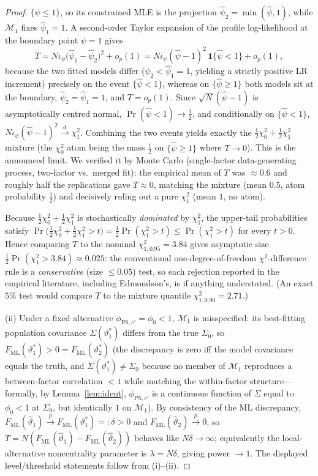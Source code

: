 \documentclass{amsart}
\theoremstyle{remark}
\begin{document}
\begin{proof}
$\{\psi\le1\}$, so its constrained MLE is the projection
$\hat\psi_{2}=\min(\hat\psi,1)$, while $\mathcal M_1$ fixes $\hat\psi_{1}=1$. A
second-order Taylor expansion of the profile log-likelihood at the boundary point
$\psi=1$ gives
\[
T= N\iota_\psi\big(\hat\psi_{1}-\hat\psi_{2}\big)^2+o_p(1)
 = N\iota_\psi(\hat\psi-1)^2\,\mathbf 1\{\hat\psi<1\}+o_p(1),
\]
because the two fitted models differ ($\hat\psi_2<\hat\psi_1=1$, yielding a strictly
positive LR increment) precisely on the event $\{\hat\psi<1\}$, whereas on
$\{\hat\psi\ge1\}$ both models sit at the boundary, $\hat\psi_2=\hat\psi_1=1$, and
$T=o_p(1)$. Since $\sqrt N(\hat\psi-1)$ is asymptotically centred normal,
$\Pr(\hat\psi<1)\to\tfrac12$, and conditionally on $\{\hat\psi<1\}$,
$N\iota_\psi(\hat\psi-1)^2\xrightarrow{d}\chi^2_1$. Combining the two events yields
exactly the $\tfrac12\chi^2_0+\tfrac12\chi^2_1$ mixture (the $\chi^2_0$ atom being
the mass $\tfrac12$ on $\{\hat\psi\ge1\}$ where $T\to0$). This is the announced
limit. We verified it by
Monte Carlo (single-factor data-generating process, two-factor vs.\ merged fit):
the empirical mean of $T$ was $\approx0.6$ and roughly half the replications gave
$T\approx0$, matching the mixture (mean $0.5$, atom probability $\tfrac12$) and
decisively ruling out a pure $\chi^2_1$ (mean $1$, no atom).

Because $\tfrac12\chi^2_0+\tfrac12\chi^2_1$ is stochastically \emph{dominated} by
$\chi^2_1$, the upper-tail probabilities satisfy
$\Pr\!\big(\tfrac12\chi^2_0+\tfrac12\chi^2_1>t\big)=\tfrac12\Pr(\chi^2_1>t)
\le\Pr(\chi^2_1>t)$ for every $t>0$. Hence comparing $T$ to the nominal
$\chi^2_{1,0.95}=3.84$ gives asymptotic size $\tfrac12\Pr(\chi^2_1>3.84)\approx0.025$:
the conventional one-degree-of-freedom $\chi^2$-difference rule is a
\emph{conservative} (size $\le0.05$) test, so each rejection reported in the
empirical literature, including Edmondson's, is if anything understated. (An exact
$5\%$ test would compare $T$ to the mixture quantile $\chi^2_{1,0.90}=2.71$.)

(ii) Under a fixed alternative $\phi_{\mathrm{PS},c'}=\phi_0<1$, $\mathcal M_1$ is
misspecified: its best-fitting population covariance $\Sigma(\vartheta_1^\ast)$
differs from the true $\Sigma_0$, so $F_{\mathrm{ML}}(\vartheta_1^\ast)>0
=F_{\mathrm{ML}}(\vartheta_2^\ast)$ (the discrepancy is zero iff the model
covariance equals the truth, and $\Sigma(\vartheta_1^\ast)\neq\Sigma_0$ because no
member of $\mathcal M_1$ reproduces a between-factor correlation $<1$ while
matching the within-factor structure---formally, by Lemma~\ref{lem:ident},
$\phi_{\mathrm{PS},c'}$ is a continuous function of $\Sigma$ equal to $\phi_0<1$ at
$\Sigma_0$, but identically $1$ on $\mathcal M_1$). By consistency of the ML
discrepancy, $F_{\mathrm{ML}}(\hat\vartheta_1)\xrightarrow{p}F_{\mathrm{ML}}(\vartheta_1^\ast)=:\delta>0$
and $F_{\mathrm{ML}}(\hat\vartheta_2)\xrightarrow{p}0$, so
$T=N(F_{\mathrm{ML}}(\hat\vartheta_1)-F_{\mathrm{ML}}(\hat\vartheta_2))$ behaves like
$N\delta\to\infty$; equivalently the local-alternative noncentrality parameter is
$\lambda=N\delta$, giving power $\to1$. The displayed level/threshold statements
follow from (i)--(ii). \end{proof}
\end{document}
